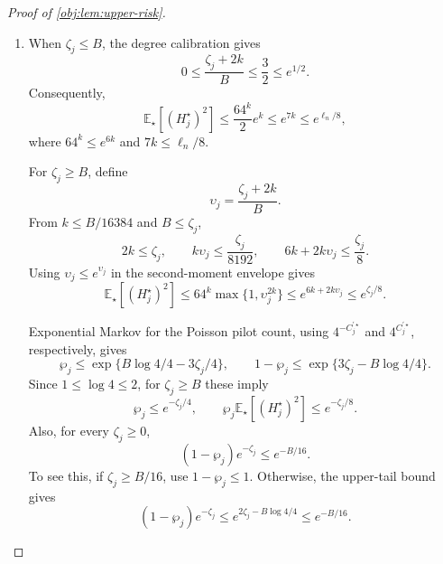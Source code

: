 \documentclass[11pt]{article}
\begin{document}
\begin{proof}[Proof of \cref{obj:lem:upper-risk}]
\begin{enumerate}
On observed-law support, \(0\le U_j^\star\le C_j^\star\), and
\[
|(U_j^\star-C_j^\star/2)(C_j^\star-1)_{v-1}|
\le\frac{(C_j^\star)_v}{2}
\le\frac{(C_j^\star)^v}{2}.
\]
For every \(z\ge0\) and \(1\le v\le k\),
\[
(z/B)^v\le\max\{1,(z/B)^k\}.
\]
The coefficient bound therefore gives the pointwise envelope
\[
(H_j^\star)^2
\le\frac{64^k}{4}
\max\left\{1,\left(\frac{C_j^\star}{B}\right)^{2k}\right\}
\le\frac{64^k}{4}
\left\{1+\left(\frac{C_j^\star}{B}\right)^{2k}\right\}.
\]
For an integer \(v\ge0\), expansion of an ordinary Poisson moment into factorial moments gives
\[
\mathbb E_\star[(C_j^\star)^v]
=\sum_{t=0}^v {v\brace t}\zeta_j^t
\le\sum_{t=0}^v\binom vt v^{\,v-t}\zeta_j^t
=(\zeta_j+v)^v.
\]
Here \({v\brace t}\) counts partitions into \(t\) nonempty blocks: choosing one representative per block and assigning the remaining elements gives
\({v\brace t}\le\binom vt v^{v-t}\). The case \(v=0\) uses the constant zeroth moment. Integrating the pointwise envelope yields
\[
\mathbb E_\star[(H_j^\star)^2]
\le\frac{64^k}{4}
\left\{1+\left(\frac{\zeta_j+2k}{B}\right)^{2k}\right\}
\le\frac{64^k}{2}
\max\left\{1,\left(\frac{\zeta_j+2k}{B}\right)^{2k}\right\}.
\]

\item When \(\zeta_j\le B\), the degree calibration gives
\[
0\le\frac{\zeta_j+2k}{B}\le\frac32\le e^{1/2}.
\]
Consequently,
\[
\mathbb E_\star[(H_j^\star)^2]
\le\frac{64^k}{2}e^k
\le e^{7k}
\le e^{\ell_n/8},
\]
where \(64^k\le e^{6k}\) and \(7k\le\ell_n/8\).

For \(\zeta_j\ge B\), define
\[
\upsilon_j=\frac{\zeta_j+2k}{B}.
\]
From \(k\le B/16384\) and \(B\le\zeta_j\),
\[
2k\le\zeta_j,\qquad
k\upsilon_j\le\frac{\zeta_j}{8192},
\qquad
6k+2k\upsilon_j\le\frac{\zeta_j}{8}.
\]
Using \(\upsilon_j\le e^{\upsilon_j}\) in the second-moment envelope gives
\[
\mathbb E_\star[(H_j^\star)^2]
\le
64^k\max\{1,\upsilon_j^{2k}\}
\le e^{6k+2k\upsilon_j}
\le e^{\zeta_j/8}.
\]

Exponential Markov for the Poisson pilot count, using \(4^{-C_j^{\prime\star}}\) and \(4^{C_j^{\prime\star}}\), respectively, gives
\[
\wp_j\le
\exp\{B\log4/4-3\zeta_j/4\},
\qquad
1-\wp_j\le
\exp\{3\zeta_j-B\log4/4\}.
\]
Since \(1\le\log4\le2\), for \(\zeta_j\ge B\) these imply
\[
\wp_j\le e^{-\zeta_j/4},
\qquad
\wp_j\mathbb E_\star[(H_j^\star)^2]
\le e^{-\zeta_j/8}.
\]
Also, for every \(\zeta_j\ge0\),
\[
(1-\wp_j)e^{-\zeta_j}\le e^{-B/16}.
\]
To see this, if \(\zeta_j\ge B/16\), use \(1-\wp_j\le1\). Otherwise, the upper-tail bound gives
\[
(1-\wp_j)e^{-\zeta_j}
\le e^{2\zeta_j-B\log4/4}
\le e^{-B/16}.
\]


\end{enumerate}
\end{proof}
\end{document}
